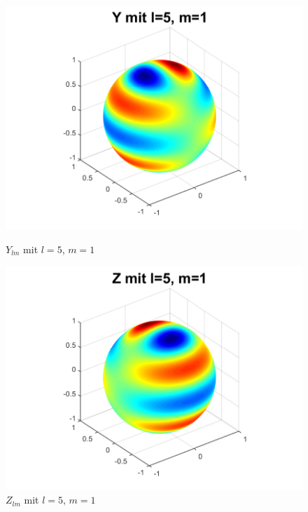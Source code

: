 \begin{refsection}
\begin{figure}
\begin{minipage}[hbt]{0.4\textwidth}
\includegraphics[width=1\textwidth]{kugel/ylm/a_5_1.pdf}
\caption{$Y_{lm}$ mit $l=5$, $m=1$}
\label{skript:ylm l=5 m=1}
\end{minipage}
\hfill
\begin{minipage}[hbt]{0.4\textwidth}
\centering
\includegraphics[width=1\textwidth]{kugel/ylm/b_5_1.pdf}
\caption{$Z_{lm}$ mit $l=5$, $m=1$}
\label{skript:zlm l=5 m=1}
\end{minipage}
\begin{minipage}[hbt]{0.4\textwidth}
\centering

\end{minipage}
\end{figure}
\end{refsection}
